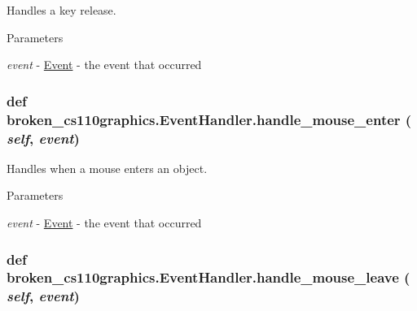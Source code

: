 Handles a key release. 
\begin{DoxyParams}{Parameters}
\item[{\em event}]-\/ \hyperlink{classbroken__cs110graphics_1_1Event}{Event} -\/ the event that occurred \end{DoxyParams}
\hypertarget{classbroken__cs110graphics_1_1EventHandler_a7c78f3d6cfd790f2e04223b84495f39b}{
\subsubsection[{handle\_\-mouse\_\-enter}]{\setlength{\rightskip}{0pt plus 5cm}def broken\_\-cs110graphics.EventHandler.handle\_\-mouse\_\-enter ( {\em self}, \/   {\em event})}}
\label{classbroken__cs110graphics_1_1EventHandler_a7c78f3d6cfd790f2e04223b84495f39b}


Handles when a mouse enters an object. 
\begin{DoxyParams}{Parameters}
\item[{\em event}]-\/ \hyperlink{classbroken__cs110graphics_1_1Event}{Event} -\/ the event that occurred \end{DoxyParams}
\hypertarget{classbroken__cs110graphics_1_1EventHandler_afc741f1f32e1bb4ccc26f8264a49f8eb}{
\subsubsection[{handle\_\-mouse\_\-leave}]{\setlength{\rightskip}{0pt plus 5cm}def broken\_\-cs110graphics.EventHandler.handle\_\-mouse\_\-leave ( {\em self}, \/   {\em event})}}
\label{classbroken__cs110graphics_1_1EventHandler_afc741f1f32e1bb4ccc26f8264a49f8eb}


